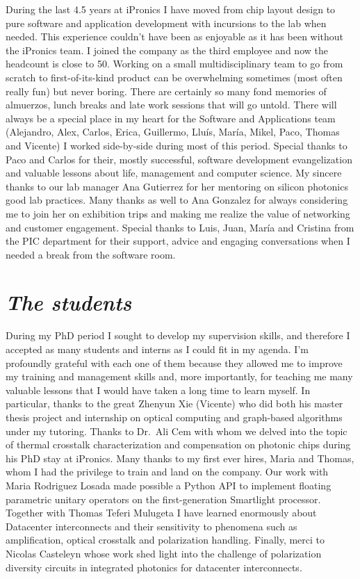 During the last 4.5 years at iPronics I have moved from chip layout design to pure software and application development with incursions to the lab when needed.
This experience couldn't have been as enjoyable as it has been without the iPronics team.
I joined the company as the third employee and now the headcount is close to 50.
Working on a small multidisciplinary team to go from scratch to first-of-its-kind product can be overwhelming sometimes (most often really fun) but never boring.
There are certainly so many fond memories of almuerzos, lunch breaks and late work sessions that will go untold.
There will always be a special place in my heart for the Software and Applications team (Alejandro, Alex, Carlos, Erica, Guillermo, Lluís, María, Mikel, Paco, Thomas and Vicente) I worked side-by-side during most of this period.
Special thanks to Paco and Carlos for their, mostly successful, software development evangelization and valuable lessons about life, management and computer science.
My sincere thanks to our lab manager Ana Gutierrez for her mentoring on silicon photonics good lab practices.
Many thanks as well to Ana Gonzalez for always considering me to join her on exhibition trips and making me realize the value of networking and customer engagement.
Special thanks to Luis, Juan, María and Cristina from the PIC department for their support, advice and engaging conversations when I needed a break from the software room.

\section*{\textit{The students}}

During my PhD period I sought to develop my supervision skills, and therefore I accepted as many students and interns as I could fit in my agenda.
I'm profoundly grateful with each one of them because they allowed me to improve my training and management skills and, more importantly, for teaching me many valuable lessons that I would have taken a long time to learn myself.
In particular, thanks to the great Zhenyun Xie (Vicente) who did both his master thesis project and internship on optical computing and graph-based algorithms under my tutoring.
Thanks to Dr.~Ali Cem with whom we delved into the topic of thermal crosstalk characterization and compensation on photonic chips during his PhD stay at iPronics.
Many thanks to my first ever hires, Maria and Thomas, whom I had the privilege to train and land on the company.
Our work with Maria Rodriguez Losada made possible a Python API to implement floating parametric unitary operators on the first-generation Smartlight processor.
Together with Thomas Teferi Mulugeta I have learned enormously about Datacenter interconnects and their sensitivity to phenomena such as amplification, optical crosstalk and polarization handling.
Finally, merci to Nicolas Casteleyn whose work shed light into the challenge of polarization diversity circuits in integrated photonics for datacenter interconnects.

